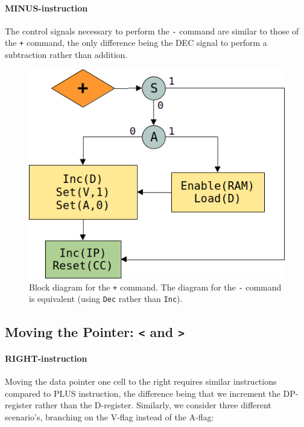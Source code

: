\paragraph{MINUS-instruction} The control signals necessary to perform the \texttt{-} command are similar to those of the \texttt{+} command, the only difference being the DEC signal to perform a subtraction rather than addition.


\begin{figure}[h]
  \centering
  \includegraphics[scale=0.3]{img/plusalg}
  \caption{Block diagram for the \texttt{+} command. The diagram for the \texttt{-} command is equivalent (using \texttt{Dec} rather than \texttt{Inc}).}
  \label{fig:plusalg}
\end{figure}

\subsection{Moving the Pointer: \texttt{<} and \texttt{>}} \label{sec:sequences:<>}
\paragraph{RIGHT-instruction} Moving the data pointer one cell to the right requires similar instructions compared to PLUS instruction, the difference being that we increment the DP-register rather than the D-register. Similarly, we consider three different scenario's, branching on the V-flag instead of the A-flag:

